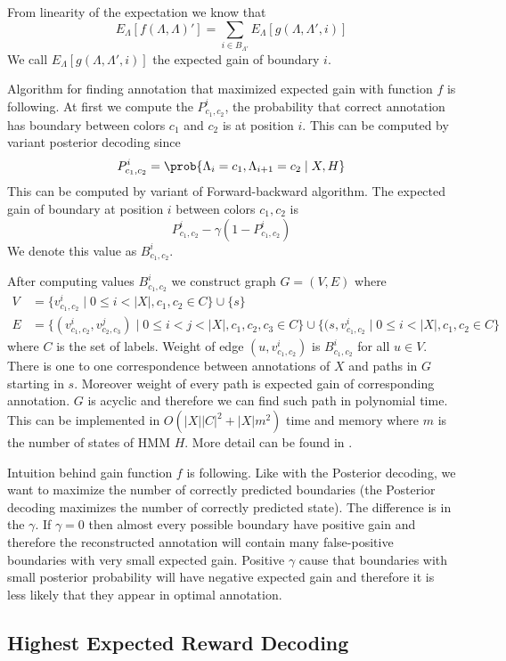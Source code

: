 From linearity of the expectation we know that
\[E_{\Lambda}[f(\Lambda,\Lambda)']=\sum_{i\in
B_{\Lambda'}}E_{\Lambda}[g(\Lambda,\Lambda',i)]\] We call
$E_{\Lambda}[g(\Lambda,\Lambda',i)]$ the expected gain of boundary $i$.


Algorithm for finding annotation that maximized expected gain with function $f$
is following. At first we compute the $P^i_{c_1,c_2}$, the probability that correct annotation
has boundary between colors $c_1$ and $c_2$ is at position $i$. This can be computed by variant posterior decoding
since 
\[P_{c_1,c_2}^i=\prob{\Lambda_i=c_1,\Lambda_{i+1}=c_2\mid X,H}\]  
This
can be computed by variant of Forward-backward algorithm.  The expected gain of
boundary at position $i$ between colors $c_1,c_2$  is 
\[P^i_{c_1,c_2}-\gamma (1-P^i_{c_1,c_2})\]
We denote this value as  $B^i_{c_1,c_2}$.

After computing values $B^i_{c_1,c_2}$ we construct graph $G=(V,E)$ where
\begin{align*}
V&=\{v^i_{c_1,c_2}\mid 0\leq i<|X|,c_1,c_2\in C\}\cup\{s\}\\
E&=\{(v^i_{c_1,c_2},v^j_{c_2,c_3})\mid 0\leq i<j< |X|, c_1,c_2,c_3\in C
\}\cup\{(s,v^i_{c_1,c_2}\mid 0\leq i< |X|, c_1,c_2\in C\} 
\end{align*}
where $C$ is the set
of labels. Weight of edge $(u,v^i_{c_1,c_2})$ is $B^i_{c_1,c_2}$ for all $u\in
V$. There is one to one correspondence between annotations of $X$ and paths in
$G$ starting in $s$. Moreover weight of every path is expected gain of
corresponding annotation. $G$ is acyclic and therefore we can find such path in
polynomial time. This can be implemented in $O(|X||C|^2+|X|m^2)$ time and memory
where $m$ is the number of states of HMM $H$. More detail can be found in
\cite{Nanasi2010mgr}.

Intuition behind gain function $f$ is following. Like with the Posterior
decoding, we want to maximize the number of correctly predicted boundaries (the
Posterior decoding maximizes the number of correctly predicted state). The
difference is in the $\gamma$. If $\gamma=0$ then almost every possible boundary
have positive gain and therefore the reconstructed annotation will contain many
false-positive boundaries with very small expected gain. Positive $\gamma$ cause
that boundaries with small posterior probability will have negative expected
gain and therefore it is less likely that they appear in optimal annotation.


\subsection{Highest Expected Reward Decoding}

